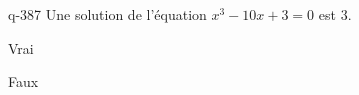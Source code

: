 \begin{truefalse}{q-387}
Une solution de l'équation $x^3-10x+3=0$ est $3$.
\item* Vrai
\item Faux
\end{truefalse}

